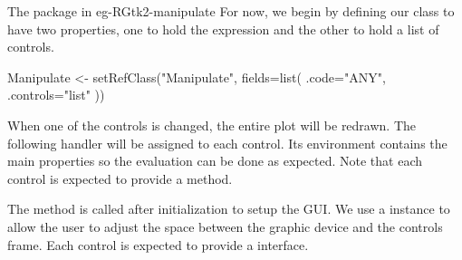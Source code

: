 \begin{example}{The  package in }{eg-RGtk2-manipulate}
For now, we begin by defining our  class to have two
properties, one to hold the expression and the other to hold a list of controls.
\begin{Schunk}
\begin{Sinput}
 Manipulate <- setRefClass("Manipulate",
                           fields=list(
                             .code="ANY",
                             .controls="list"
                             ))
\end{Sinput}
\end{Schunk}
%



When one of the controls is changed, the entire plot will be
redrawn. The following handler will be assigned to each control. Its
environment contains the main properties so the evaluation can be done
as expected. Note that each control is expected to provide a
 method.

\begin{Schunk}
\end{Schunk}
%

The  method is called after initialization to setup the
GUI. We use a  instance to allow the user to adjust
the space between the graphic device and the controls frame. Each
control is expected to provide a  interface.


\end{example}
